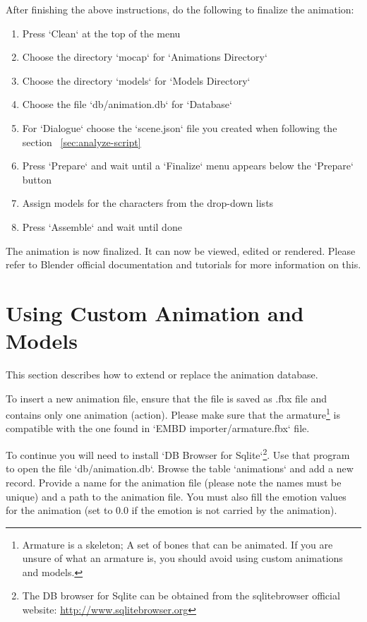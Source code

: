 \noindent After finishing the above instructions, do the following to finalize the animation:
\begin{enumerate}
	\item Press `Clean` at the top of the menu
	\item Choose the directory `mocap` for `Animations Directory`
	\item Choose the directory `models` for `Models Directory`
	\item Choose the file `db/animation.db` for `Database`
	\item For `Dialogue` choose the `scene.json` file you created when following the section ~\ref{sec:analyze-script}
	\item Press `Prepare` and wait until a `Finalize` menu appears below the `Prepare` button
	\item Assign models for the characters from the drop-down lists
	\item Press `Assemble` and wait until done
\end{enumerate}

\noindent The animation is now finalized. It can now be viewed, edited or rendered. Please refer to Blender official documentation and tutorials for more information on this.

\section{Using Custom Animation and Models}
This section describes how to extend or replace the animation database.

To insert a new animation file, ensure that the file is saved as .fbx file and contains only one animation (action). Please make sure that the armature\footnote{Armature is a skeleton; A set of bones that can be animated. If you are unsure of what an armature is, you should avoid using custom animations and models.} is compatible with the one found in `EMBD importer/armature.fbx` file.

To continue you will need to install `DB Browser for Sqlite`\footnote{The DB browser for Sqlite can be obtained from the sqlitebrowser official website:  \url{http://www.sqlitebrowser.org}}. Use that program to open the file `db/animation.db`. Browse the table `animations` and add a new record. Provide a name for the animation file (please note the names must be unique) and a path to the animation file. You must also fill the emotion values for the animation (set to 0.0 if the emotion is not carried by the animation).

